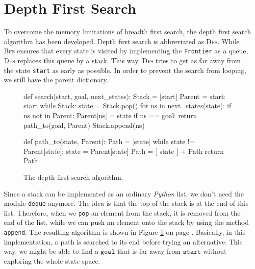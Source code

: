 \section{Depth First Search}
To overcome the memory limitations of breadth first search, the
\href{https://en.wikipedia.org/wiki/Depth-first_search}{depth first search} algorithm 
has been developed.  Depth first search is abbreviated as \textsc{Dfs}.
While \textsc{Bfs} ensures that every state is visited by implementing the \texttt{Frontier} as a queue,
\textsc{Dfs} replaces this queue by a \href{https://en.wikipedia.org/wiki/Stack_(abstract_data_type)}{stack}.  This way, \textsc{Dfs} tries to get as far away from the state
\texttt{start} as early as possible.  In order to prevent the search from looping, we still have the parent dictionary.

\begin{figure}[!ht]
\centering
\begin{python3code}
    def search(start, goal, next_states):
        Stack  = [start]
        Parent = { start: start }
        while Stack:
            state = Stack.pop()
            for ns in next_states(state):
                if ns not in Parent:
                    Parent[ns] = state
                    if ns == goal:
                        return path_to(goal, Parent)
                    Stack.append(ns)

    def path_to(state, Parent):
       Path = [state]
       while state != Parent[state]:
           state = Parent[state]
           Path  = [ state ] + Path
       return Path
\end{python3code}
\vspace*{-0.3cm}
\caption{The depth first search algorithm.}
\label{fig:Depth-First-Search-Stack.ipynb}
\end{figure}
\FloatBarrier

Since a stack can be implemented as an ordinary \textsl{Python} list, we don't need the module
\texttt{deque} anymore.  The idea is that the top of the stack is at the end of this list.
Therefore, when we \texttt{pop} an element from the stack, it is removed from the end of the list, while we can
push an element onto the stack by using the method \texttt{append}.  The resulting algorithm is shown in Figure
\ref{fig:Depth-First-Search-Stack.ipynb} on page \pageref{fig:Depth-First-Search-Stack.ipynb}.  Basically, in this
implementation, a path is searched to its end before trying an alternative.  This way, we might be able to find a
$\texttt{goal}$ that is far away from $\texttt{start}$ without exploring the whole state space.



